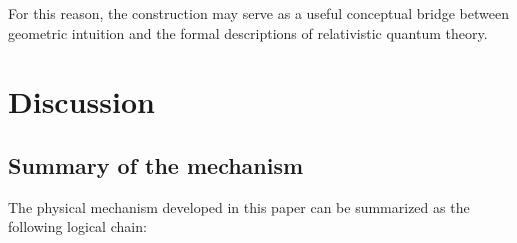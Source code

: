 \documentclass[%
 reprint, amsmath,amssymb, aps, prb, ]{revtex4-2}
\numberwithin{equation}{section}
\begin{document}
For this reason, the construction may serve as a useful conceptual bridge between geometric intuition and the formal descriptions of relativistic quantum theory.

\section{Discussion}
\label{sec:discussion}

\subsection{Summary of the mechanism}

The physical mechanism developed in this paper can be summarized as the following logical chain:
\end{document}
